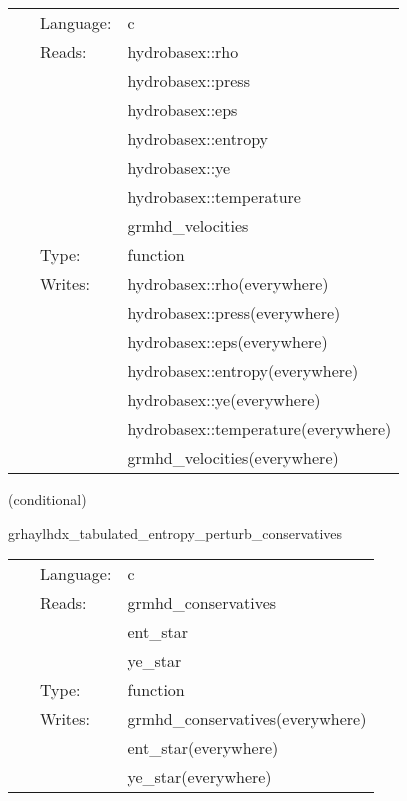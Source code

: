 \documentclass{article}
\begin{document}
 \begin{tabular*}{160mm}{cll} 
~ & Language:  & c \\ 
~ & Reads:  & hydrobasex::rho \\ 
~& ~ &hydrobasex::press\\ 
~& ~ &hydrobasex::eps\\ 
~& ~ &hydrobasex::entropy\\ 
~& ~ &hydrobasex::ye\\ 
~& ~ &hydrobasex::temperature\\ 
~& ~ &grmhd\_velocities\\ 
~ & Type:  & function \\ 
~ & Writes:  & hydrobasex::rho(everywhere) \\ 
~& ~ &hydrobasex::press(everywhere)\\ 
~& ~ &hydrobasex::eps(everywhere)\\ 
~& ~ &hydrobasex::entropy(everywhere)\\ 
~& ~ &hydrobasex::ye(everywhere)\\ 
~& ~ &hydrobasex::temperature(everywhere)\\ 
~& ~ &grmhd\_velocities(everywhere)\\ 
\end{tabular*} 


\vspace{5mm}

   (conditional) 

\hspace{5mm} grhaylhdx\_tabulated\_entropy\_perturb\_conservatives 

\hspace{5mm}{\it entropy+tabulated version of grhaylhdx\_perturb\_conservatives } 


\hspace{5mm}

 \begin{tabular*}{160mm}{cll} 
~ & Language:  & c \\ 
~ & Reads:  & grmhd\_conservatives \\ 
~& ~ &ent\_star\\ 
~& ~ &ye\_star\\ 
~ & Type:  & function \\ 
~ & Writes:  & grmhd\_conservatives(everywhere) \\ 
~& ~ &ent\_star(everywhere)\\ 
~& ~ &ye\_star(everywhere)\\ 
\end{tabular*} 
\end{document}
